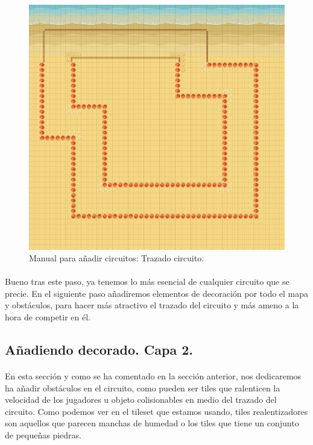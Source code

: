 \begin{figure}[H]
  \label{circuito_trazado}
  \begin{center}
    \includegraphics[scale=0.5]{imagenes/manualcircuito/circuito_trazado.png}
  \end{center}
  \caption{Manual para añadir circuitos: Trazado circuito.}
\end{figure}

\paragraph{}
Bueno tras este paso, ya tenemos lo más esencial de cualquier circuito que se precie. En el siguiente paso añadiremos elementos
de decoración por todo el mapa y obstáculos, para hacer más atractivo el
trazado del circuito y más ameno a la hora de 
competir en él.

\subsection{Añadiendo decorado. Capa 2.}

\paragraph{}
En esta sección y como se ha comentado en la sección anterior, nos dedicaremos
ha añadir obstáculos en el circuito, como pueden ser
tiles que ralenticen la velocidad de los jugadores u objeto colisionables en medio del trazado del circuito. Como podemos ver en
el tileset que estamos usando, tiles realentizadores son aquellos que parecen
manchas de humedad o los tiles que tiene un conjunto 
de pequeñas piedras.

